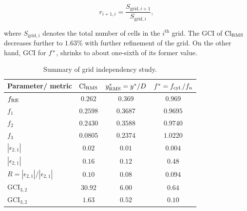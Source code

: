 \documentclass[oneside]{utmthesis}
\begin{document}
\begin{equation}
  r_{i+1,i} = \frac{S_{\text{grid},i+1}}{S_{\text{grid},i}},
  \label{eq:refinementRatio}
\end{equation}

\noindent where $S_{\text{grid},i}$ denotes the total number of cells in the $i^{\text{th}}$ grid. The GCI of $\text{Cl}_{\text{RMS}}$ decreases further to $1.63\%$ with further refinement of the grid. On the other hand, GCI for $f^{*}$, shrinks to about one-sixth of its former value.

\begin{table}[!ht]
\centering
\caption{Summary of grid independency study.} \label{tab:gridIndependency}
\vspace{\baselineskip}
\begin{tabular}{l c c c}
  \hline
  \hline
Parameter/ metric                                                       & $\text{Cl}_{\text{RMS}}$       & $y^{*}_{\text{RMS}} = y^{*}/D$ & $f^{*} = f_{\text{cyl.}} / f_{n}$ \\
  \hline
$f_{\text{RE}}$                                                                  & $0.262$        & $0.369$           & $0.969$               \\
$f_{1}$                                                                 & $0.2598$       & $0.3687$          & $0.9695$              \\
$f_{2}$                                                                 & $0.2430$       & $0.3588$          & $0.9740$              \\
$f_{3}$                                                                 & $0.0805$       & $0.2374$          & $1.0220$              \\
$\left | \epsilon_{2,1} \right |$                                       & $0.02$         & $0.01$            & $0.004$               \\
$\left | \epsilon_{2,1} \right |$                                       & $0.16$         & $0.12$            & $0.48$                \\
$R = \left | \epsilon_{2,1} \right | / \left | \epsilon_{2,1} \right |$ & $0.10$         & $0.08$            & $0.094$               \\
$\text{GCI}_{3,2}$                                                      & $30.92$        & $6.00$            & $0.64$                \\  
$\text{GCI}_{3,2}$                                                      & $1.63$         & $0.52$            & $0.10$                \\
  \hline
  \hline
\end{tabular}
\end{table}
\end{document}

